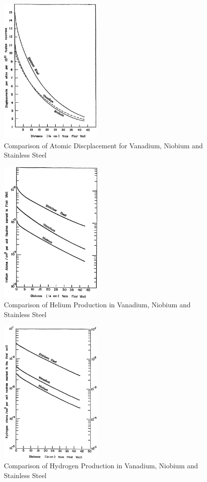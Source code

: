\documentclass[11pt]{report} %
\begin{document}
\begin{figure}[h!]
  \centering
  \includegraphics[width=0.45\textwidth]{figs/dpa.png}
  \caption{Comparison of Atomic Discplacement for Vanadium, Niobium and Stainless Steel}
  \label{fig:dpa}
\end{figure}
\begin{figure}[h!]
  \centering
  \includegraphics[width=0.45\textwidth]{figs/HeProduction.png}
  \caption{Comparison of Helium Production in Vanadium, Niobium and Stainless Steel}
  \label{fig:HeProduction}
\end{figure}
\begin{figure}[H]
  \centering
  \includegraphics[width=0.45\textwidth]{figs/HProduction.png}
  \caption{Comparison of Hydrogen Production in Vanadium, Niobium and Stainless Steel}
  \label{fig:HProduction}
\end{figure}
\end{document}
